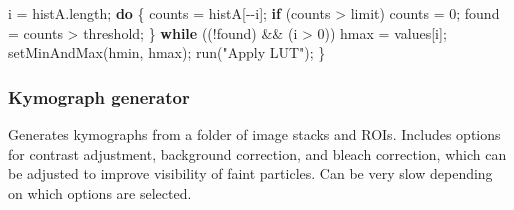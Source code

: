 \documentclass[
  12pt,
  a4paper,
]{book}
\newenvironment{Shaded}{}{}
\newcommand{\ControlFlowTok}[1]{\textcolor[rgb]{0.00,0.44,0.13}{\textbf{#1}}}
\newcommand{\DecValTok}[1]{\textcolor[rgb]{0.25,0.63,0.44}{#1}}
\newcommand{\NormalTok}[1]{#1}
\newcommand{\OperatorTok}[1]{\textcolor[rgb]{0.40,0.40,0.40}{#1}}
\newcommand{\StringTok}[1]{\textcolor[rgb]{0.25,0.44,0.63}{#1}}
\begin{document}
\begin{Shaded}
\begin{Highlighting}[]
\NormalTok{    i }\OperatorTok{=}\NormalTok{ histA}\OperatorTok{.}\NormalTok{length}\OperatorTok{;} 
    \ControlFlowTok{do} \OperatorTok{\{} 
\NormalTok{            counts }\OperatorTok{=}\NormalTok{ histA}\OperatorTok{[{-}{-}}\NormalTok{i}\OperatorTok{];} 
            \ControlFlowTok{if} \OperatorTok{(}\NormalTok{counts }\OperatorTok{\textgreater{}}\NormalTok{ limit}\OperatorTok{)}\NormalTok{ counts }\OperatorTok{=} \DecValTok{0}\OperatorTok{;} 
\NormalTok{            found }\OperatorTok{=}\NormalTok{ counts }\OperatorTok{\textgreater{}}\NormalTok{ threshold}\OperatorTok{;} 
    \OperatorTok{\}} \ControlFlowTok{while} \OperatorTok{((!}\NormalTok{found}\OperatorTok{)} \OperatorTok{\&\&} \OperatorTok{(}\NormalTok{i }\OperatorTok{\textgreater{}} \DecValTok{0}\OperatorTok{))} 
\NormalTok{    hmax }\OperatorTok{=}\NormalTok{ values}\OperatorTok{[}\NormalTok{i}\OperatorTok{];} 
\NormalTok{    setMinAndMax}\OperatorTok{(}\NormalTok{hmin}\OperatorTok{,}\NormalTok{ hmax}\OperatorTok{);} 
\NormalTok{    run}\OperatorTok{(}\StringTok{"Apply LUT"}\OperatorTok{);} 
\OperatorTok{\}}
\end{Highlighting}
\end{Shaded}

\subsubsection{Kymograph generator}\label{kymograph-generator}

Generates kymographs from a folder of image stacks and ROIs. Includes options for contrast adjustment, background correction, and bleach correction, which can be adjusted to improve visibility of faint particles. Can be very slow depending on which options are selected.
\end{document}

